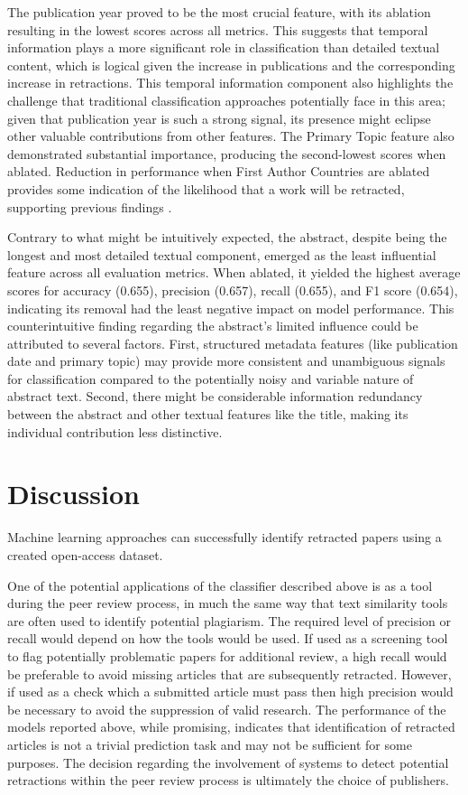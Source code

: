 \documentclass[pdflatex,sn-mathphys-num]{sn-jnl}
\begin{document}
The publication year proved to be the most crucial feature, with its ablation resulting in the lowest scores across all metrics. This suggests that temporal information plays a more significant role in classification than detailed textual content, which is logical given the increase in publications and the corresponding increase in retractions. This temporal information component also highlights the challenge that traditional classification approaches potentially face in this area; given that publication year is such a strong signal, its presence might eclipse other valuable contributions from other features. The Primary Topic feature also demonstrated substantial importance, producing the second-lowest scores when ablated. Reduction in performance when First Author Countries are ablated provides some indication of the likelihood that a work will be retracted, supporting previous findings \cite{stretton_publication_2012}.

Contrary to what might be intuitively expected, the abstract, despite being the longest and most detailed textual component, emerged as the least influential feature across all evaluation metrics. When ablated, it yielded the highest average scores for accuracy (0.655), precision (0.657), recall (0.655), and F1 score (0.654), indicating its removal had the least negative impact on model performance. This counterintuitive finding regarding the abstract's limited influence could be attributed to several factors. First, structured metadata features (like publication date and primary topic) may provide more consistent and unambiguous signals for classification compared to the potentially noisy and variable nature of abstract text. Second, there might be considerable information redundancy between the abstract and other textual features like the title, making its individual contribution less distinctive.

\section{Discussion}\label{sec:Discussion}


Machine learning approaches can successfully identify retracted papers using a created open-access dataset.


One of the potential applications of the classifier described above is as a tool during the peer review process, in much the same way that text similarity tools are often used to identify potential plagiarism. The required level of precision or recall would depend on how the tools would be used. If used as a screening tool to flag potentially problematic papers for additional review, a high recall would be preferable to avoid missing articles that are subsequently retracted. However, if used as a check which a submitted article must pass then high precision would be necessary to avoid the suppression of valid research. The performance of the models reported above, while promising, indicates that identification of retracted articles is not a trivial prediction task and may not be sufficient for some purposes. The decision regarding the involvement of systems to detect potential retractions within the peer review process is ultimately the choice of publishers.
\end{document}
